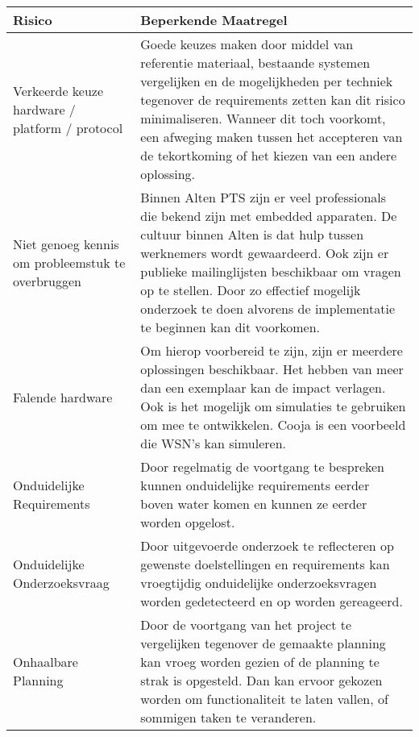 \documentclass{../local}
\begin{document}
\begin{center}
\begin{tabular}{| p{5cm}| p{9cm}|}
\hline
{\bf Risico} & {\bf Beperkende Maatregel}\\
\hline

Verkeerde keuze hardware / platform / protocol & Goede keuzes maken door middel van referentie materiaal, bestaande systemen vergelijken en de mogelijkheden per techniek tegenover de requirements zetten kan dit risico minimaliseren. Wanneer dit toch voorkomt, een afweging maken tussen het accepteren van de tekortkoming of het kiezen van een andere oplossing.\\
\hline
Niet genoeg kennis om probleemstuk te overbruggen & Binnen Alten PTS zijn er veel professionals die bekend zijn met embedded apparaten. De cultuur binnen Alten is dat hulp tussen werknemers wordt gewaardeerd. Ook zijn er publieke mailinglijsten beschikbaar om vragen op te stellen. Door zo effectief mogelijk onderzoek te doen alvorens de implementatie te beginnen kan dit voorkomen.\\
\hline
Falende hardware & Om hierop voorbereid te zijn, zijn er meerdere oplossingen beschikbaar. Het hebben van meer dan een exemplaar kan de impact verlagen. Ook is het mogelijk om simulaties te gebruiken om mee te ontwikkelen. Cooja is een voorbeeld die WSN's kan simuleren.\\
\hline
Onduidelijke Requirements & Door regelmatig de voortgang te bespreken kunnen onduidelijke requirements eerder boven water komen en kunnen ze eerder worden opgelost.\\
\hline
Onduidelijke Onderzoeksvraag & Door uitgevoerde onderzoek te reflecteren op gewenste doelstellingen en requirements kan vroegtijdig onduidelijke onderzoeksvragen worden gedetecteerd en op worden gereageerd.\\
\hline
Onhaalbare Planning & Door de voortgang van het project te vergelijken tegenover de gemaakte planning kan vroeg worden gezien of de planning te strak is opgesteld. Dan kan ervoor gekozen worden om functionaliteit te laten vallen, of sommigen taken te veranderen.\\
\hline

\end{tabular}
\end{center}
\end{document}
